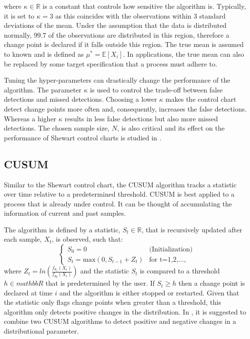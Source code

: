 where $\kappa \in \mathbb{R}$ is a constant that controls how sensitive the algorithm is. Typically, it is set to $\kappa=3$ as this coincides with the observations within $3$ standard deviations of the mean. Under the assumption that the data is distributed normally, $99.7$ of the observations are distributed in this region, therefore a change point is declared if it falls outside this region. The true mean is assumed to known and is defined as $\mu^* = \mathbb{E}[X_i]$. In applications, the true mean can also be replaced by some target specification that a process must adhere to.

Tuning the hyper-parameters can drastically change the performance of the algorithm. The parameter $\kappa$ is used to control the trade-off between false detections and missed detections. Choosing a lower $\kappa$ makes the control chart detect change points more often and, consequently, increases the false detections. Whereas a higher $\kappa$ results in less false detections but also more missed detections. The chosen sample size, $N$, is also critical and its effect on the performance of Shewart control charts is studied in \cite{haridy2017effect}.

\subsection{CUSUM}
Similar to the Shewart control chart, the CUSUM algorithm tracks a statistic over time relative to a predetermined threshold. CUSUM is best applied to a process that is already under control. It can be thought of accumulating the information of current and past samples. 

The algorithm is defined by a statistic, $S_t \in \mathbb{R}$, that is recursively updated after each sample, $X_t$, is observed, such that:
\begin{equation}
  \begin{cases}
    S_0 = 0  & \text{(Initialization)} \\
    S_t = \text{max}(0, S_{t-1} + Z_t) & \text{for t=1,2,...,}
  \end{cases}
\end{equation}
where $Z_t=ln(\frac{f_{\theta_1}(X_i)}{f_{\theta_0}(X_i)})$ and the statistic $S_t$ is compared to a threshold $h \in mathbb{R}$ that is predetermined by the user. If $S_t \geq h$ then a change point is declared at time $i$ and the algorithm is either stopped or restarted. Given that the statistic only flags change points when greater than a threshold, this algorithm only detects positive changes in the distribution. In \cite{page1954continuous}, it is suggested to combine two CUSUM algorithms to detect positive and negative changes in a distributional parameter.

